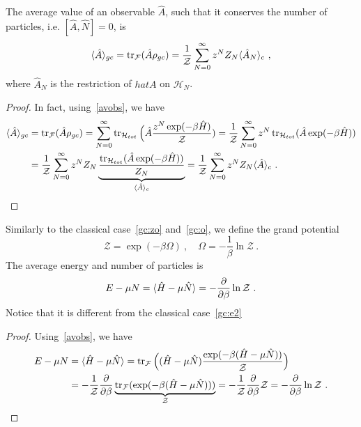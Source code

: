     The average value of an observable $\hat A$, such that it conserves the number of particles, i.e. $[\hat A, \hat N] = 0$, is
    \begin{equation}\label{qgc:av}
        \langle\hat A\rangle_{gc} = \operatorname{tr}_{\mathcal F} (\hat A \rho_{gc}) = \frac{1}{\mathcal Z} \sum_{N=0}^{\infty} z^N Z_N \langle\hat A_N\rangle_c ~,
    \end{equation}
    where $\hat A_N$ is the restriction of $hat A$ on $\mathcal H_N$.
    \begin{proof}
        In fact, using~\eqref{avobs}, we have
        \begin{equation*}
        \begin{aligned}
            \langle\hat A\rangle_{gc} & = \operatorname{tr}_{\mathcal F} (\hat A \rho_{gc}) = \sum_{N=0}^{\infty} \operatorname{tr}_{\mathcal H_{tot}} \Big (\hat A \frac{z^N \exp(- \beta \hat H)}{\mathcal Z}) = \frac{1}{\mathcal Z} \sum_{N=0}^{\infty} z^N \operatorname{tr}_{\mathcal H_{tot}} (\hat A \exp(- \beta \hat H)) \\ & = \frac{1}{\mathcal Z} \sum_{N=0}^{\infty} z^N Z_N \underbrace{\frac{\operatorname{tr}_{\mathcal H_{tot}} (\hat A \exp(- \beta \hat H))}{Z_N}}_{\langle\hat A\rangle_c} = \frac{1}{\mathcal Z} \sum_{N=0}^{\infty} z^N Z_N \langle\hat A\rangle_c ~.
        \end{aligned}
        \end{equation*}
    \end{proof}
    
    Similarly to the classical case~\eqref{gc:zo} and~\eqref{gc:o}, we define the grand potential 
    \begin{equation}\label{qgc:o}
        \mathcal Z = \exp(- \beta \Omega) ~, \quad \Omega = - \frac{1}{\beta} \ln \mathcal Z ~.
    \end{equation}
    The average energy and number of particles is
    \begin{equation*}
        E - \mu N = \langle\hat H - \mu \hat N\rangle = - \frac{\partial}{\partial\beta} \ln \mathcal Z ~.
    \end{equation*}
    Notice that it is different from the classical case~\eqref{gc:e2}
    \begin{proof}
        Using~\eqref{avobs}, we have
        \begin{equation*}
        \begin{aligned}
            E - \mu N & = \langle\hat H - \mu \hat N\rangle  = \operatorname{tr}_{\mathcal F} \Big ( (\hat H - \mu \hat N) \frac{\exp( - \beta (\hat H - \mu \hat N))}{\mathcal Z} \Big) \\ & = - \frac{1}{\mathcal Z} \frac{\partial}{\partial\beta} \underbrace{\operatorname{tr}_{\mathcal F} (\exp(- \beta (\hat H - \mu \hat N)))}_{\mathcal Z} = - \frac{1}{\mathcal Z} \frac{\partial}{\partial\beta} \mathcal Z  = - \frac{\partial}{\partial\beta} \ln \mathcal Z ~.
        \end{aligned}
        \end{equation*}
    \end{proof}


